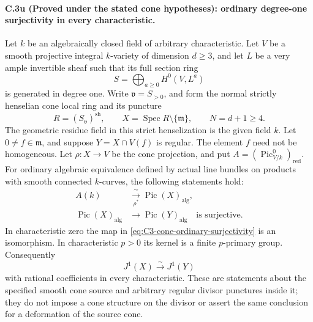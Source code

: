 \paragraph{C.3u (Proved under the stated cone hypotheses): ordinary degree-one surjectivity in every characteristic.}
Let $k$ be an algebraically closed field of arbitrary
characteristic. Let $V$ be a smooth projective integral
$k$-variety of dimension $d\ge3$, and let $L$ be a
very ample invertible sheaf such that its full section
ring
\[
 S=\bigoplus_{a\ge0}H^0(V,L^a)
\]
is generated in degree one. Write $\mathfrak v=S_{>0}$,
and form the normal strictly henselian cone local ring
and its puncture
\[
 R=(S_{\mathfrak v})^{\mathrm{sh}},\qquad
 X=\operatorname{Spec}R\setminus\{\mathfrak m\},
 \qquad N=d+1\ge4.
\]
The geometric residue field in this strict
henselization is the given field $k$. Let
$0\ne f\in\mathfrak m$, and suppose
$Y=X\cap V(f)$ is regular. The element $f$ need
not be homogeneous. Let $\rho:X\to V$ be the
cone projection, and put
$A=(\operatorname{Pic}^0_{V/k})_{\mathrm{red}}$.
For ordinary algebraic equivalence defined by
actual line bundles on products with smooth
connected $k$-curves, the following statements hold:
\begin{align}
 A(k)&\xrightarrow[\rho^*]{\ \sim\ }
                    \operatorname{Pic}(X)_{\mathrm{alg}},
                    \label{eq:C3-cone-ordinary-source}\\
 \operatorname{Pic}(X)_{\mathrm{alg}}
       &\longrightarrow\operatorname{Pic}(Y)_{\mathrm{alg}}
                    \quad\text{is surjective}.
                    \label{eq:C3-cone-ordinary-surjectivity}
\end{align}
In characteristic zero the map in
\eqref{eq:C3-cone-ordinary-surjectivity} is an
isomorphism. In characteristic $p>0$ its kernel
is a finite $p$-primary group. Consequently
\[
                       J^1(X)\xrightarrow{\ \sim\ }J^1(Y)
\]
with rational coefficients in every characteristic.
These are statements about the specified smooth
cone source and arbitrary regular divisor punctures
inside it; they do not impose a cone structure
on the divisor or assert the same conclusion
for a deformation of the source cone.

